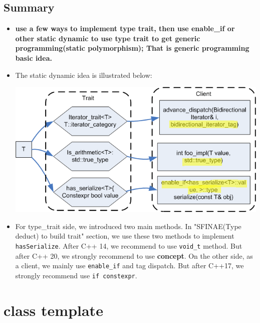 \documentclass[a4paper,11pt,twoside]{book}
\begin{document}
\subsection{Summary}
\begin{itemize}
	\item \textbf{use a few ways to implement type trait, then use enable\_if or other static dynamic to use type trait to get generic programming(static polymorphism); That is generic programming basic idea.}
	
	\item The static dynamic idea is illustrated below:

\begin{center}
	\includegraphics[scale=0.9]{pics/tag_dispatch.png}
\end{center}

	\item For type\_trait side, we introduced two main methods. In "SFINAE(Type deduct) to build trait" section, we use these two methods to implement \texttt{hasSerialize}. After C++ 14, we recommend to use \texttt{void\_t} method. But after C++ 20, we strongly recommend to use \textbf{concept}. On the other side, as a client, we mainly use \texttt{enable\_if} and tag dispatch. But after C++17, we strongly recommend use \texttt{if constexpr}.
	
\end{itemize}

\section{class template}
\end{document}
